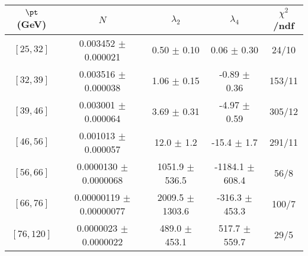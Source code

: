 \begin{tabular}{c||c|c|c|c}
$\pt$ (GeV) & $N$ & $\lambda_{2}$ & $\lambda_4$  & $\chi^2$/ndf  \\
\hline
$[25, 32]$ & 0.003452 $\pm$ 0.000021 & 0.50 $\pm$ 0.10 & 0.06 $\pm$ 0.30 & 24/10\\
$[32, 39]$ & 0.003516 $\pm$ 0.000038 & 1.06 $\pm$ 0.15 & -0.89 $\pm$ 0.36 & 153/11\\
$[39, 46]$ & 0.003001 $\pm$ 0.000064 & 3.69 $\pm$ 0.31 & -4.97 $\pm$ 0.59 & 305/12\\
$[46, 56]$ & 0.001013 $\pm$ 0.000057 & 12.0 $\pm$ 1.2 & -15.4 $\pm$ 1.7 & 291/11\\
$[56, 66]$ & 0.0000130 $\pm$ 0.0000068 & 1051.9 $\pm$ 536.5 & -1184.1 $\pm$ 608.4 & 56/8\\
$[66, 76]$ & 0.00000119 $\pm$ 0.00000077 & 2009.5 $\pm$ 1303.6 & -316.3 $\pm$ 453.3 & 100/7\\
$[76, 120]$ & 0.0000023 $\pm$ 0.0000022 & 489.0 $\pm$ 453.1 & 517.7 $\pm$ 559.7 & 29/5\\
\end{tabular}
